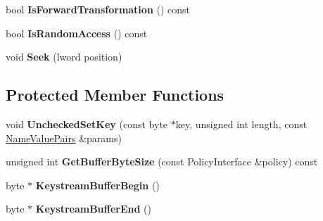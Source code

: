 \begin{DoxyCompactItemize}
\item 
\hypertarget{class_additive_cipher_template_a50dfbc6747819dd334fd30be63d2d03c}{
bool {\bfseries IsForwardTransformation} () const }
\label{class_additive_cipher_template_a50dfbc6747819dd334fd30be63d2d03c}

\item 
\hypertarget{class_additive_cipher_template_a286650935516d27eaa8003dd9f6bf299}{
bool {\bfseries IsRandomAccess} () const }
\label{class_additive_cipher_template_a286650935516d27eaa8003dd9f6bf299}

\item 
\hypertarget{class_additive_cipher_template_a68d4dc2904da4df5a7ead785ad7bc67e}{
void {\bfseries Seek} (lword position)}
\label{class_additive_cipher_template_a68d4dc2904da4df5a7ead785ad7bc67e}

\end{DoxyCompactItemize}
\subsection*{Protected Member Functions}
\begin{DoxyCompactItemize}
\item 
\hypertarget{class_additive_cipher_template_a81cd8dec0920e628b3238820eed566ef}{
void {\bfseries UncheckedSetKey} (const byte $\ast$key, unsigned int length, const \hyperlink{class_name_value_pairs}{NameValuePairs} \&params)}
\label{class_additive_cipher_template_a81cd8dec0920e628b3238820eed566ef}

\item 
\hypertarget{class_additive_cipher_template_a2b8c6e4e11ac35c6f267991d0b62f84c}{
unsigned int {\bfseries GetBufferByteSize} (const PolicyInterface \&policy) const }
\label{class_additive_cipher_template_a2b8c6e4e11ac35c6f267991d0b62f84c}

\item 
\hypertarget{class_additive_cipher_template_aa0b80a8012abd9061b9522102737069b}{
byte $\ast$ {\bfseries KeystreamBufferBegin} ()}
\label{class_additive_cipher_template_aa0b80a8012abd9061b9522102737069b}

\item 
\hypertarget{class_additive_cipher_template_a99f88c7364a00f78d4afe44f4c962e9e}{
byte $\ast$ {\bfseries KeystreamBufferEnd} ()}
\label{class_additive_cipher_template_a99f88c7364a00f78d4afe44f4c962e9e}

\end{DoxyCompactItemize}
